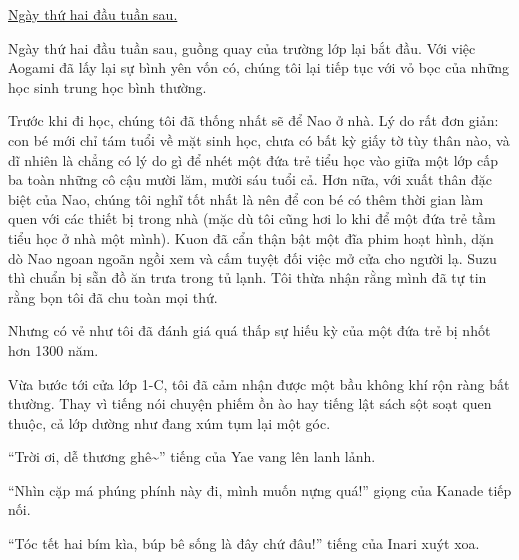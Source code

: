 \documentclass[../main.tex]{subfiles}
\begin{document}

\begin{center}
    \uline{Ngày thứ hai đầu tuần sau.}
\end{center}

Ngày thứ hai đầu tuần sau, guồng quay của trường lớp lại bắt đầu. Với việc Aogami đã lấy lại sự bình yên vốn có, chúng tôi lại tiếp tục với vỏ bọc của những học sinh trung học bình thường.

Trước khi đi học, chúng tôi đã thống nhất sẽ để Nao ở nhà. Lý do rất đơn giản: con bé mới chỉ tám tuổi về mặt sinh học, chưa có bất kỳ giấy tờ tùy thân nào, và dĩ nhiên là chẳng có lý do gì để nhét một đứa trẻ tiểu học vào giữa một lớp cấp ba toàn những cô cậu mười lăm, mười sáu tuổi cả. Hơn nữa, với xuất thân đặc biệt của Nao, chúng tôi nghĩ tốt nhất là nên để con bé có thêm thời gian làm quen với các thiết bị trong nhà (mặc dù tôi cũng hơi lo khi để một đứa trẻ tầm tiểu học ở nhà một mình). Kuon đã cẩn thận bật một đĩa phim hoạt hình, dặn dò Nao ngoan ngoãn ngồi xem và cấm tuyệt đối việc mở cửa cho người lạ. Suzu thì chuẩn bị sẵn đồ ăn trưa trong tủ lạnh. Tôi thừa nhận rằng mình đã tự tin rằng bọn tôi đã chu toàn mọi thứ.

Nhưng có vẻ như tôi đã đánh giá quá thấp sự hiếu kỳ của một đứa trẻ bị nhốt hơn 1300 năm.

Vừa bước tới cửa lớp 1-C, tôi đã cảm nhận được một bầu không khí rộn ràng bất thường. Thay vì tiếng nói chuyện phiếm ồn ào hay tiếng lật sách sột soạt quen thuộc, cả lớp dường như đang xúm tụm lại một góc.

``Trời ơi, dễ thương ghê\~{}'' tiếng của Yae vang lên lanh lảnh.

``Nhìn cặp má phúng phính này đi, mình muốn nựng quá!'' giọng của Kanade tiếp nối.

``Tóc tết hai bím kìa, búp bê sống là đây chứ đâu!'' tiếng của Inari xuýt xoa.
\end{document}
